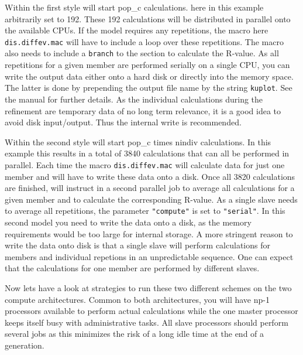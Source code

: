 Within the first style \Diffev will start pop\_c calculations. here in this
example arbitrarily set to 192. These 192 calculations will be distributed in
parallel onto the available CPUs. If the model requires any repetitions, the
\Discus macro here {\tt dis.diffev.mac} will have to include a loop over these
repetitions. The \Discus macro also needs to include a {\tt branch} to the 
\Kuplot section to calculate the R-value. As all repetitions for a given member 
are performed serially on a single CPU, you can write the \Discus output
data either onto a hard disk or directly into the \Kuplot memory space. The 
latter is done by prepending the output file name by the string {\tt kuplot}.
See the \Discus manual for further details. As the individual calculations 
during the refinement are temporary data of no long term relevance, it is a
good idea to avoid disk input/output. Thus the internal write is recommended.

Within the second style \Diffev will start pop\_c times nindiv calculations.
In this example this results in a total of 3840 calculations that can all be
performed in parallel. Each time the \Discus macro {\tt dis.diffev.mac} will
calculate data for just one member and will have to write these data onto a 
disk. Once all 3820 calculations are finished, \Diffev will instruct \Kuplot 
in a second parallel job to average all calculations for a given member and to 
calculate the corresponding R-value. As a single \Kuplot slave needs to average 
all repetitions, the parameter {\tt "compute"} is set to {\tt "serial"}. 
In this second model you need to write 
the data onto a disk, as the memory requirements would be too large for 
internal storage. A more stringent reason to write the data onto disk is that 
a single slave will perform calculations for members and individual repetions
in an unpredictable sequence. One can expect that the calculations for one 
member are performed by different slaves.

Now lets have a look at strategies to run these two different schemes on the 
two compute architectures. Common to both architectures, you will have np-1
processors available to perform actual calculations while the one master
processor keeps itself busy with administrative tasks. All slave processors 
should perform several jobs as this minimizes the risk of a long idle time 
at the end of a generation. 

